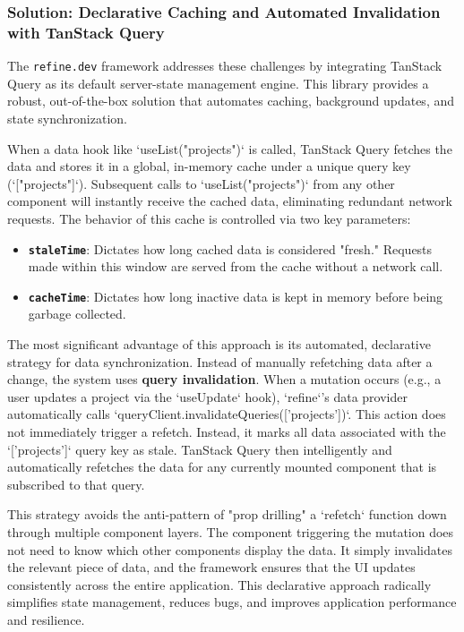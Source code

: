 \subsubsection{Solution: Declarative Caching and Automated Invalidation with TanStack Query}
The \texttt{refine.dev} framework addresses these challenges by integrating TanStack Query as its default server-state management engine. This library provides a robust, out-of-the-box solution that automates caching, background updates, and state synchronization.

When a data hook like `useList("projects")` is called, TanStack Query fetches the data and stores it in a global, in-memory cache under a unique query key (`["projects"]`). Subsequent calls to `useList("projects")` from any other component will instantly receive the cached data, eliminating redundant network requests. The behavior of this cache is controlled via two key parameters:
\begin{itemize}
    \item \textbf{\texttt{staleTime}}: Dictates how long cached data is considered "fresh." Requests made within this window are served from the cache without a network call.
    \item \textbf{\texttt{cacheTime}}: Dictates how long inactive data is kept in memory before being garbage collected.
\end{itemize}

The most significant advantage of this approach is its automated, declarative strategy for data synchronization. Instead of manually refetching data after a change, the system uses \textbf{query invalidation}.
When a mutation occurs (e.g., a user updates a project via the `useUpdate` hook), `refine`'s data provider automatically calls `queryClient.invalidateQueries(['projects'])`. This action does not immediately trigger a refetch. Instead, it marks all data associated with the `['projects']` query key as stale. TanStack Query then intelligently and automatically refetches the data for any currently mounted component that is subscribed to that query.

This strategy avoids the anti-pattern of "prop drilling" a `refetch` function down through multiple component layers. The component triggering the mutation does not need to know which other components display the data. It simply invalidates the relevant piece of data, and the framework ensures that the UI updates consistently across the entire application. This declarative approach radically simplifies state management, reduces bugs, and improves application performance and resilience.


